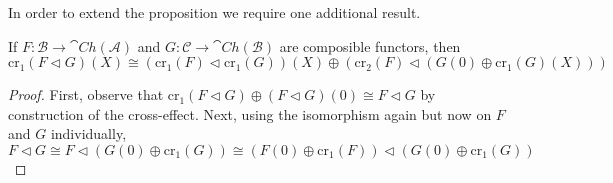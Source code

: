 In order to extend the proposition we require one additional result.

\begin{lem}[label=lem:compGen]
    If $F:\mathcal{B}\to \cat{Ch}(\mathcal{A})$ and $G:\mathcal{C}\to \cat{Ch}(\mathcal{B})$ are composible functors, then 
    \begin{equation*}
        \text{cr}_1(F\lhd G)(X) \cong (\text{cr}_1(F)\lhd \text{cr}_1(G))(X)\oplus (\text{cr}_2(F)\lhd (G(0)\oplus \text{cr}_1(G)(X)))
    \end{equation*}
\end{lem}
\begin{proof}
    First, observe that $\text{cr}_1(F\lhd G)\oplus (F\lhd G)(0) \cong F\lhd G$ by construction of the cross-effect. Next, using the isomorphism again but now on $F$ and $G$ individually,
    \begin{equation*}
        F\lhd G \cong F\lhd (G(0)\oplus \text{cr}_1(G)) \cong (F(0)\oplus \text{cr}_1(F))\lhd (G(0)\oplus \text{cr}_1(G))
    \end{equation*}
    
\end{proof}

